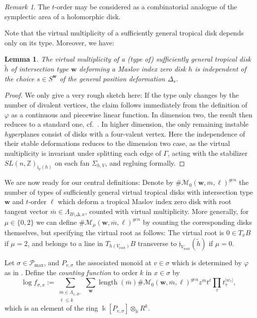 \documentclass[11pt,letter]{amsart}
\newtheorem{lemma}[theorem]{Lemma}
\theoremstyle{definition}
\theoremstyle{remark}
\newtheorem{remark}[theorem]{Remark}
\numberwithin{equation}{section}
\numberwithin{figure}{section}
\newcommand{\length}{\operatorname{length}}
\newcommand{\defbase}{S^{\mathbf w}}
\newcommand {\foj}  {\mathfrak{j}}
\newcommand {\kk} {\Bbbk}
\renewcommand {\max} {{\operatorname{max}}}
\renewcommand{\P}  {\mathscr{P}}
\newcommand {\rootvertex}  {V_{\mathrm{root}}}
\begin{document}
\begin{remark}
\label{t-order}
The $t$-order may be considered as a combinatorial analogue of the
symplectic area of a holomorphic disk.
\end{remark}

Note that the virtual multiplicity of a sufficiently general tropical disk
depends only on its type. Moreover, we have:

\begin{lemma}
The virtual multiplicity of a (type of) sufficiently general tropical disk
$\tilde h$ of intersection type $\mathbf w$ deforming a Maslov index zero disk
$h$ is independent of the choice $s\in \defbase$ of the general position
deformation $\Delta_s$.
\end{lemma}

\begin{proof}
We only give a very rough sketch here: If the type only changes by the number of
divalent vertices, the claim follows immediately from the definition of
$\varphi$ as a continuous and piecewise linear function. In dimension two, the
result then reduces to a standard one, cf.~\cite{gat}. In higher dimension, the
only remaining instable \emph{hyper}planes consist of disks with a four-valent
vertex. Here the independence of their stable deformations reduces to the
dimension two case, as the virtual multiplicity is invariant under splitting
each edge of $\Gamma$, acting with the stabilizer $SL(n,\mathbb Z)_{\foj_V(h)}$
on each fan $\Sigma_{h,V}$, and regluing formally.
\end{proof}

We are now ready for our central definitions: Denote by $\# \mathcal M_0(\mathbf
w,\overline m,\ell)^{gen}$ the number of types of sufficiently general virtual
tropical disks with intersection type $\mathbf w$ and $t$-order $\ell$ which
deform a tropical Maslov index zero disk with root tangent vector $\overline
m\in \Lambda_{B\setminus \Delta, x}$, counted with virtual multiplicity. More
generally, for $\mu\in \{0,2\}$ we can define $\# \mathcal M_\mu(\mathbf
w,\overline m,\ell)^{gen} $ by counting the corresponding disks themselves, but
specifying the virtual root as follows: The virtual root is $0\in T_xB$ if $\mu
=2$, and belongs to a line in $T_{h(\rootvertex)}B$ transverse to
$\foj_{\rootvertex}(\tilde h)$ if $\mu = 0$.

Let $\sigma \in \P_\max$, and $ P_{v,\sigma}$ the associated monoid at $v\in
\sigma$ which is determined by $\varphi$ as in
\cite[Constr.\,2.7]{affinecomplex}. Define the \emph{counting function} to
order $k$ in $x\in \sigma$ by
\begin{equation}
\label{countfct}
\log f_{\sigma, x}:= \sum_
{\substack{\overline m \in \Lambda_{x,B}, \\
\ell \leq k} }
\sum_ {\mathbf w}   \length (\overline m)\#\mathcal M_0
(\mathbf w, \overline m, \ell)^{gen}z^{\overline m}t^{\ell}
\prod_{ \tau} t_{ \tau}^{|w_{ \tau}| },
\end{equation}
which is an element of the ring $\kk[P_{v,\sigma}]\otimes_\kk R^k$.
\end{document}
